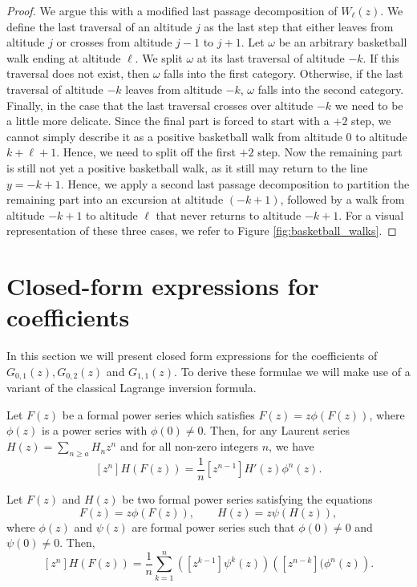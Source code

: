 \begin{proof}
  We argue this with a modified last passage decomposition of $W_\ell(z)$.
  We define the last traversal of an altitude $j$ as the last step that either leaves from altitude $j$ or crosses from altitude $j - 1$ to $j + 1$.
  Let $\omega$ be an arbitrary basketball walk ending at altitude $\ell$.
  We split $\omega$ at its last traversal of altitude $-k$. If this traversal does not exist, then $\omega$ falls into the first category.
  Otherwise, if the last traversal of altitude $-k$ leaves from altitude $-k$, $\omega$ falls into the second category.
  Finally, in the case that the last traversal crosses over altitude $-k$ we need to be a little more delicate. Since the final part is forced to start with a $+2$ step, we cannot simply describe it as a positive basketball walk from altitude $0$ to altitude $k + \ell + 1$. Hence, we need to split off the first $+2$ step. Now the remaining part is still not yet a positive basketball walk, as it still may return to the line $y = -k + 1$. Hence, we apply a second last passage decomposition to partition the remaining part into an excursion at altitude $(-k + 1)$, followed by a walk from altitude $-k + 1$ to altitude $\ell$ that never returns to altitude $-k + 1$. For a visual representation of these three cases, we refer to Figure \ref{fig:basketball_walks}.
\end{proof}

\section{Closed-form expressions for coefficients}

In this section we will present closed form expressions for the coefficients of $G_{0,1}(z), G_{0,2}(z)$ and $G_{1,1}(z)$. To derive these formulae we will make use of a variant of the classical Lagrange inversion formula.

\begin{theorem} \label{thm:lagrange_inversion}
  Let $F(z)$ be a formal power series which satisfies $F(z) = z\phi(F(z))$, where $\phi(z)$ is a power series with $\phi(0) \neq 0$. Then, for any Laurent series $H(z) = \sum_{n \geq a}H_nz^n$ and for all non-zero integers $n$, we have
  $$
    [z^n]H(F(z)) = \frac{1}{n}[z^{n-1}]H'(z)\phi^n(z).
  $$
\end{theorem}

\begin{lemma}\label{lemma:lagrange_inversion_variant}
  Let $F(z)$ and $H(z)$ be two formal power series satisfying the equations
  $$
  F(z) = z\phi(F(z)), \qquad H(z) = z\psi(H(z)),
  $$
  where $\phi(z)$ and $\psi(z)$ are formal power series such that $\phi(0) \neq 0$ and $\psi(0) \neq 0$. Then,
  $$
  [z^{n}]H(F(z)) = \frac{1}{n}\sum_{k=1}^{n}\left([z^{k-1}]\psi^{k}(z)\right)\left([z^{n-k}](\phi^{n}(z)\right).
  $$
\end{lemma}

